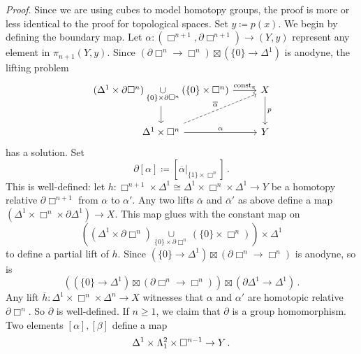         \emph{Proof}. Since we are using cubes to model homotopy groups, the proof is more or less identical to the proof for topological spaces. Set $y \coloneq p(x)$.
        We begin by defining the boundary map. Let $\alpha \colon (\Box^{n+1}, \partial \Box^{n+1}) \to (Y, y)$ represent any element in $\pi_{n+1}(Y, y)$. Since $(\partial \Box^n \to \Box^n) \boxtimes (\{0\} \to \Delta^1)$ is anodyne, the lifting problem
        \begin{equation*}
            \begin{tikzcd}
                (\Delta^1 \times \partial \Box^n) \underset{\{0\} \times \partial \Box^n}{\cup} (\{0\} \times \Box^n) \arrow[d] \arrow[r, "\const_x"] & X \arrow[d, "p"] \\
                \Delta^1 \times \Box^n \arrow[ur, dashed, "\overline{\alpha}"] \arrow[r, "\alpha"] & Y 
            \end{tikzcd}
        \end{equation*}
        has a solution. Set
        \begin{equation*}
            \partial [\alpha] \coloneq [{\overline{\alpha}|}_{\{1\} \times \Box^n}] \,.
        \end{equation*}
        This is well-defined: let $h \colon \Box^{n+1} \times \Delta^1 \cong \Delta^1 \times \Box^n \times \Delta^1 \to Y$ be a homotopy relative $\partial \Box^{n+1}$ from $\alpha$ to $\alpha'$. Any two lifts $\overline{\alpha}$ and $\overline{\alpha}'$ as above define a map $(\Delta^1 \times \Box^n \times \partial \Delta^1) \to X$. This map glues with the constant map on
        \begin{equation*}
            ((\Delta^1 \times \partial \Box^n) \underset{\{0\} \times \partial \Box^n}{\cup} (\{0\} \times \Box^n)) \times \Delta^1
        \end{equation*}
        to define a partial lift of $h$. Since $(\{0\} \to \Delta^1) \boxtimes (\partial \Box^n \to \Box^n)$ is anodyne, so is
        \begin{equation*}
            ((\{0\} \to \Delta^1) \boxtimes (\partial \Box^n \to \Box^n)) \boxtimes (\partial \Delta^1 \to \Delta^1) \,.
        \end{equation*}
        Any lift $\overline{h} \colon \Delta^1 \times \Box^n \times \Delta^n \to X$ witnesses that $\alpha$ and $\alpha'$ are homotopic relative $\partial \Box^n$. So $\partial$ is well-defined.
        If $n \geq 1$, we claim that $\partial$ is a group homomorphism. Two elements $[\alpha], [\beta]$ define a map
        \begin{equation*}
            \Delta^1 \times \Lambda^{2}_{1} \times \Box^{n-1} \to Y \,.
        \end{equation*}
